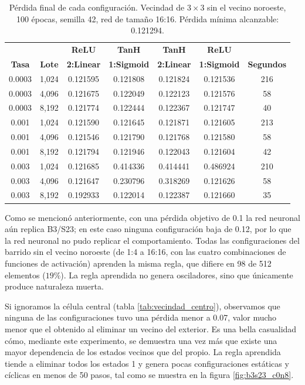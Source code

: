 \begin{table}[H]
	\centering
	\small
	\begin{tabular}{ccccccc}
		\toprule
		& & \textbf{ReLU} & \textbf{TanH} & \textbf{TanH} & \textbf{ReLU} &  \\
		\textbf{Tasa} & \textbf{Lote} & \textbf{2:Linear }&  \textbf{1:Sigmoid }& \textbf{2:Linear  }& \textbf{1:Sigmoid} & \textbf{Segundos}  \\
		\midrule
		0.0003 & 1,024 & 0.121595 & 0.121808 & 0.121824 & 0.121536 & 216 \\
		0.0003 & 4,096 & 0.121675 & 0.122049 & 0.122123 & 0.121576 & 58 \\
		0.0003 & 8,192 & 0.121774 & 0.122444 & 0.122367 & 0.121747 & 40 \\
		\midrule
		0.001 & 1,024 & 0.121590 & 0.121645 & 0.121871 & 0.121605 & 213 \\
		0.001 & 4,096 & 0.121546 & 0.121790 & 0.121768 & 0.121580 & 58 \\
		0.001 & 8,192 & 0.121794 & 0.121946 & 0.122043 & 0.121604 & 42 \\
		\midrule
		0.003 & 1,024 & 0.121685 & 0.414336 & 0.414441 & 0.486924 & 210 \\
		0.003 & 4,096 & 0.121647 & 0.230796 & 0.318269 & 0.121626 & 58 \\
		0.003 & 8,192 & 0.192933 & 0.122014 & 0.122387 & 0.121660 & 35 \\
		\bottomrule
	\end{tabular}
	\caption{Pérdida final de cada configuración. Vecindad de $3 \times 3$ sin el vecino noroeste, 100 épocas, semilla 42, red de tamaño 16:16. Pérdida mínima alcanzable: 0.121294.}
	\label{tab:vecindad_ajuste_16x16}
\end{table}

Como se mencionó anteriormente, con una pérdida objetivo de 0.1 la red neuronal aún replica B3/S23; en este caso ninguna configuración baja de 0.12, por lo que la red neuronal no pudo replicar el comportamiento. Todas las configuraciones del barrido sin el vecino noroeste (de 1:4 a 16:16, con las cuatro combinaciones de funciones de activación) aprenden la misma regla, que difiere en 98 de 512 elementos ($19\%$). La regla aprendida no genera osciladores, sino que únicamente produce naturaleza muerta. 

Si ignoramos la célula central (tabla \ref{tab:vecindad_centro}), observamos que ninguna de las configuraciones tuvo una pérdida menor a 0.07, valor mucho menor que el obtenido al eliminar un vecino del exterior. Es una bella casualidad cómo, mediante este experimento, se demuestra una vez más que existe una mayor dependencia de los estados vecinos que del propio. La regla aprendida tiende a eliminar todos los estados 1 y genera pocas configuraciones estáticas y cíclicas en menos de 50 pasos, tal como se muestra en la figura \ref{fig:b3s23_c0n8}.

